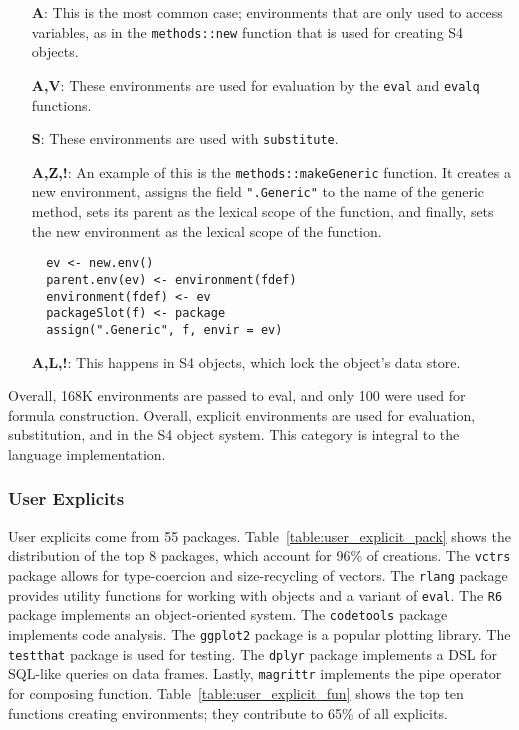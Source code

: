 \documentclass[10pt,sigplan,authorversion=true]{acmart}
\renewcommand{\c}[1]{\lstinline |#1|\xspace}
\begin{document}
\begin{itemize}
\item[{\bf A}:] This is the most common case; environments that are only used to
  access variables, as in the \c{methods::new} function that is used for
  creating S4 objects.
\item[{\bf A,V}:] These environments are used for evaluation by the \c{eval} and
  \c{evalq} functions.
\item[{\bf S}:] These environments are used with \c{substitute}.
\item[{\bf A,Z,!}:] An example of this is the \c{methods::makeGeneric} function.
  It creates a new environment, assigns the field \c{".Generic"} to the name of
  the generic method, sets its parent as the lexical scope of the function, and
  finally, sets the new environment as the lexical scope of the function.
\begin{lstlisting}
  ev <- new.env()
  parent.env(ev) <- environment(fdef)
  environment(fdef) <- ev
  packageSlot(f) <- package
  assign(".Generic", f, envir = ev)
\end{lstlisting}\medskip

\item[{\bf A,L,!}:] This happens in S4 objects, which lock the object's data
  store.
\end{itemize}

\noindent
Overall, 168K environments are passed to eval, and only 100 were used for
formula construction. Overall, explicit environments are used for evaluation,
substitution, and in the S4 object system. This category is integral to the
language implementation.

\subsubsection{User Explicits}

User explicits come from 55 packages. Table~\ref{table:user_explicit_pack} shows
the distribution of the top 8 packages, which account for 96\% of creations. The
\c{vctrs} package allows for type-coercion and size-recycling of vectors. The
\c{rlang} package provides utility functions for working with objects and a
variant of \c{eval}. The \c{R6} package implements an object-oriented system.
The \c{codetools} package implements code analysis. The \c{ggplot2} package is a
popular plotting library. The \c{testthat} package is used for testing. The
\c{dplyr} package implements a DSL for SQL-like queries on data frames. Lastly,
\c{magrittr} implements the pipe operator for composing function.
Table~\ref{table:user_explicit_fun} shows the top ten functions creating
environments; they contribute to 65\% of all explicits.
\end{document}
